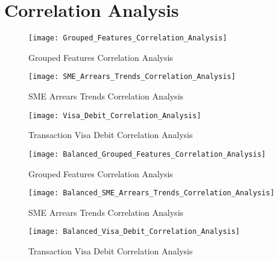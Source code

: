 
\chapter{Correlation Analysis} %

\label{AppendixB} %



\begin{figure}[H]
	\texttt{[image: Grouped\_Features\_Correlation\_Analysis]}
	\caption[Grouped Features Correlation Analysis]
	{Grouped Features Correlation Analysis}
	\label{fig:Grouped_Features_Correlation_Analysis}
\end{figure}

\begin{figure}[H]
	\texttt{[image: SME\_Arrears\_Trends\_Correlation\_Analysis]}
	\caption[SME Arrears Trends Correlation Analysis]
	{SME Arrears Trends Correlation Analysis}
	\label{fig:SME_Arrears_Trends_Correlation_Analysis}
\end{figure}
\begin{figure}[H]
	\texttt{[image: Visa\_Debit\_Correlation\_Analysis]}
	\caption[Transaction Visa Debit Correlation Analysis]
	{Transaction Visa Debit Correlation Analysis}
	\label{fig:Transaction_Visa_Debit_Correlation_Analysis}
\end{figure}
\begin{figure}[H]
	\texttt{[image: Balanced\_Grouped\_Features\_Correlation\_Analysis]}
	\caption[Balanced Grouped Features Correlation Analysis]
	{Grouped Features Correlation Analysis}
	\label{fig:Grouped_Features_Correlation_Analysis}
\end{figure}
\begin{figure}[H]
	\texttt{[image: Balanced\_SME\_Arrears\_Trends\_Correlation\_Analysis]}
	\caption[Balanced SME Arrears Trends Correlation Analysis]
	{SME Arrears Trends Correlation Analysis}
	\label{fig:SME_Arrears_Trends_Correlation_Analysis}
\end{figure}
\begin{figure}[H]
	\texttt{[image: Balanced\_Visa\_Debit\_Correlation\_Analysis]}
	\caption[Balanced Transaction Visa Debit Correlation Analysis]
	{Transaction Visa Debit Correlation Analysis}
	\label{fig:Transaction_Visa_Debit_Correlation_Analysis}
\end{figure}

